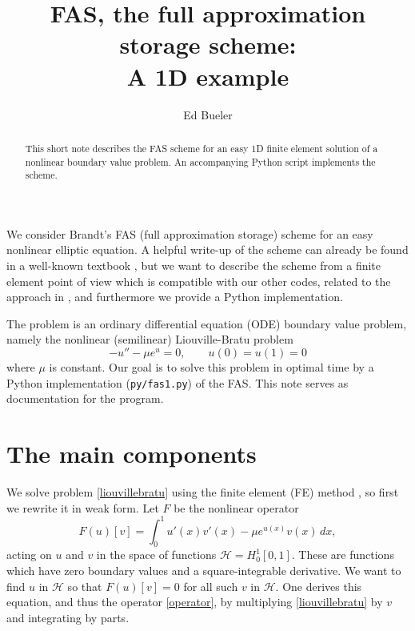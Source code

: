 \documentclass[letterpaper,final,12pt,reqno]{amsart}
\begin{document}
\title[FAS, the full approximation storage scheme]{FAS, the full approximation storage scheme: \\ A 1D example}

\author{Ed Bueler}

\begin{abstract}  This short note describes the FAS scheme for an easy 1D finite element solution of a nonlinear boundary value problem.  An accompanying Python script implements the scheme.
\end{abstract}

\maketitle

\thispagestyle{empty}
\bigskip

We consider Brandt's FAS (full approximation storage) scheme \cite{Brandt1977} for an easy nonlinear elliptic equation.  A helpful write-up of the scheme can already be found in a well-known textbook \cite[Chapter 6]{Briggsetal2000}, but we want to describe the scheme from a finite element point of view which is compatible with our other codes, related to the approach in \cite{GraeserKornhuber2009}, and furthermore we provide a Python implementation.

The problem is an ordinary differential equation (ODE) boundary value problem, namely the nonlinear (semilinear) Liouville-Bratu problem \cite[for example]{Bueler2021}
\begin{equation}
  -u'' - \mu e^u = 0,  \qquad u(0) = u(1) = 0  \label{liouvillebratu}
\end{equation}
where $\mu$ is constant.  Our goal is to solve this problem in optimal time by a Python implementation (\texttt{py/fas1.py}) of the FAS.  This note serves as documentation for the program.


\section{The main components}

We solve problem \eqref{liouvillebratu} using the finite element (FE) method \cite{Bueler2021,Elmanetal2014}, so first we rewrite it in weak form.  Let $F$ be the nonlinear operator
\begin{equation}
  F(u)[v] = \int_0^1 u'(x) v'(x) - \mu e^{u(x)} v(x)\, dx,  \label{operator}
\end{equation}
acting on $u$ and $v$ in the space of functions $\mathcal{H}=H_0^1[0,1]$.  These are functions which have zero boundary values and a square-integrable derivative.  We want to find $u$ in $\mathcal{H}$ so that $F(u)[v] = 0$ for all such $v$ in $\mathcal{H}$.  One derives this equation, and thus the operator \eqref{operator}, by multiplying \eqref{liouvillebratu} by $v$ and integrating by parts.
\end{document}
